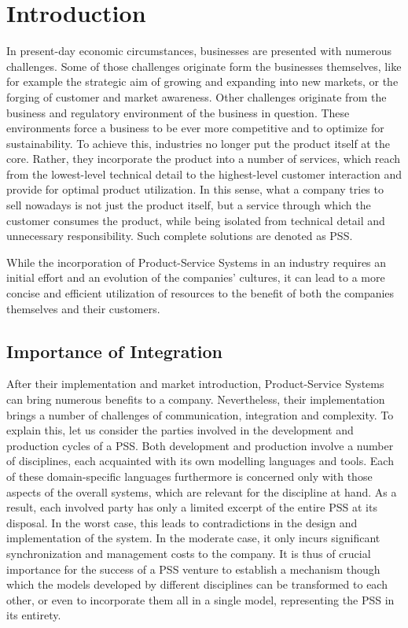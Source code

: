 \chapter{Introduction}
\label{chap:intro}

In present-day economic circumstances, businesses are presented with numerous challenges. Some of those challenges originate form the businesses themselves, like for example the strategic aim of growing and expanding into new markets, or the forging of customer and market awareness. Other challenges originate from the business and regulatory environment of the business in question. These environments force a business to be ever more competitive and to optimize for sustainability. To achieve this, industries no longer put the product itself at the core. Rather, they incorporate the product into a number of services, which reach from the lowest-level technical detail to the highest-level customer interaction and provide for optimal product utilization. In this sense, what a company tries to sell nowadays is not just the product itself, but a service through which the customer consumes the product, while being isolated from technical detail and unnecessary responsibility. Such complete solutions are denoted as \gls{PSS}.

While the incorporation of Product-Service Systems in an industry requires an initial effort and an evolution of the companies' cultures, it can lead to a more concise and efficient utilization of resources to the benefit of both the companies themselves and their customers. 

\section*{Importance of Integration}

After their implementation and market introduction, Product-Service Systems can bring numerous benefits to a company. Nevertheless, their implementation brings a number of challenges of communication, integration and complexity. To explain this, let us consider the parties involved in the development and production cycles of a \gls{PSS}. Both development and production involve a number of disciplines, each acquainted with its own modelling languages and tools. Each of these domain-specific languages furthermore is concerned only with those aspects of the overall systems, which are relevant for the discipline at hand. As a result, each involved party has only a limited excerpt of the entire \gls{PSS} at its disposal. In the worst case, this leads to contradictions in the design and implementation of the system. In the moderate case, it only incurs significant synchronization and management costs to the company. It is thus of crucial importance for the success of a PSS venture to establish a mechanism though which the models developed by different disciplines can be transformed to each other, or even to incorporate them all in a single model, representing the \gls{PSS} in its entirety.


